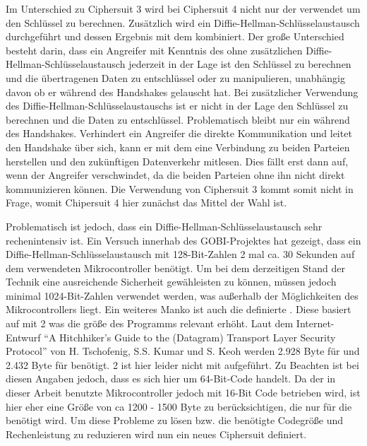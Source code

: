 Im Unterschied zu Ciphersuit 3 wird bei Ciphersuit 4 nicht nur der  verwendet um den Schlüssel zu berechnen. Zusätzlich wird ein
Diffie-Hellman-Schlüsselaustausch durchgeführt und dessen Ergebnis mit dem  kombiniert. Der große Unterschied besteht darin, dass
ein Angreifer mit Kenntnis des  ohne zusätzlichen Diffie-Hellman-Schlüsselaustausch jederzeit in der Lage ist den Schlüssel zu
berechnen und die übertragenen Daten zu entschlüssel oder zu manipulieren, unabhängig davon ob er während des Handshakes gelauscht hat.
Bei zusätzlicher Verwendung des Diffie-Hellman-Schlüsselaustauschs ist er nicht in der Lage den Schlüssel zu berechnen und die Daten zu
entschlüssel. Problematisch bleibt nur ein  während des Handshakes. Verhindert ein Angreifer die direkte
Kommunikation und leitet den Handshake über sich, kann er mit dem  eine Verbindung zu beiden Parteien herstellen und den
zukünftigen Datenverkehr mitlesen. Dies fällt erst dann auf, wenn der Angreifer verschwindet, da die beiden Parteien ohne ihn nicht
direkt kommunizieren können. Die Verwendung von Ciphersuit 3 kommt somit nicht in Frage, womit Chipersuit 4 hier zunächst das Mittel
der Wahl ist.

Problematisch ist jedoch, dass ein Diffie-Hellman-Schlüsselaustausch sehr rechenintensiv ist. Ein Versuch innerhab des GOBI-Projektes hat
gezeigt, dass ein Diffie-Hellman-Schlüsselaustausch mit 128-Bit-Zahlen 2 mal ca. 30 Sekunden auf dem verwendeten Mikrocontroller benötigt.
Um bei dem derzeitigen Stand der Technik eine ausreichende Sicherheit gewähleisten zu können, müssen jedoch minimal 1024-Bit-Zahlen
verwendet werden, was außerhalb der Möglichkeiten des Mikrocontrollers liegt. Ein weiteres Manko ist auch die definierte .
Diese basiert auf  mit 2 was die größe des Programms relevant erhöht. Laut dem Internet-Entwurf "`A Hitchhiker's
Guide to the (Datagram) Transport Layer Security Protocol"' \cite{draftmintls} von H. Tschofenig, S.S. Kumar und S. Keoh werden
2.928 Byte für  und 2.432 Byte für  benötigt. 2 ist hier leider nicht mit aufgeführt. Zu Beachten ist bei diesen Angaben
jedoch, dass es sich hier um 64-Bit-Code handelt. Da der in dieser Arbeit benutzte Mikrocontroller jedoch mit 16-Bit Code betrieben wird, ist hier
eher eine Größe von ca 1200 - 1500 Byte zu berücksichtigen, die nur für die  benötigt wird. Um diese Probleme zu lösen bzw. die benötigte
Codegröße und Rechenleistung zu reduzieren wird nun ein neues Ciphersuit definiert.

